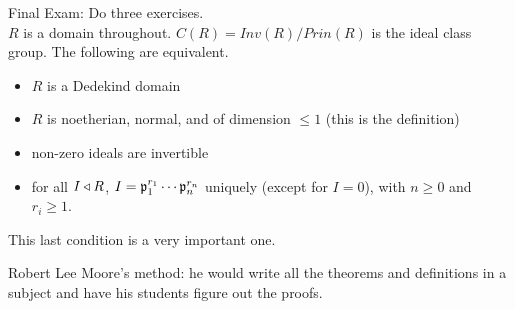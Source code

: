  \setcounter{lecture}{39}

 Final Exam: Do three exercises. \\
 $R$ is a domain throughout. $C(R)=Inv(R)/Prin(R)$ is the ideal class group. The
 following are equivalent.
 \begin{itemize}
   \item $R$ is a Dedekind domain
   \item $R$ is noetherian, normal, and of dimension $\le 1$ (this is the definition)
   \item non-zero ideals are invertible
   \item for all $I\triangleleft R$, $I=\mathfrak{p}_1^{r_1}\cdots \mathfrak{p}_n^{r_n}$ uniquely (except for $I=0$),
   with $n\ge 0$ and $r_i\ge 1$.
 \end{itemize}
 This last condition is a very important one.

 Robert Lee Moore's method: he would write all the theorems and definitions in a subject and
 have his students figure out the proofs.

